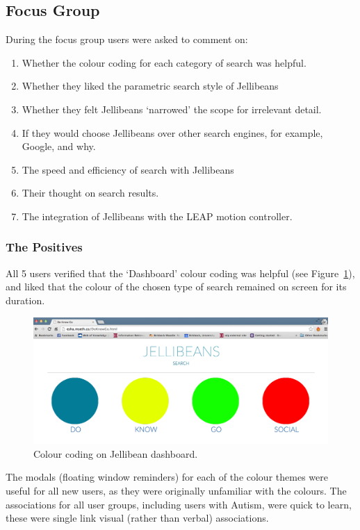 \documentclass[a4paper, 11pt]{article}
\begin{document}
\subsection{Focus Group}
During the focus group users were asked to comment on:
\begin{enumerate}
\item{Whether the colour coding for each category of search was helpful.}
\item{Whether they liked the parametric search style of Jellibeans}
\item{Whether they felt Jellibeans `narrowed' the scope for irrelevant detail.}
\item{If they would choose Jellibeans over other search engines, for example, Google, and why.}
\item{The speed and efficiency of search with Jellibeans}
\item{Their thought on search results.}
\item{The integration of Jellibeans with the LEAP motion controller.}
\end{enumerate}

\subsubsection{The Positives}
All 5 users verified that the `Dashboard' colour coding was helpful (see Figure~\ref{colourCoding}), and liked that the colour of the chosen type of search remained on screen for its duration.

\begin{figure}[H]
\begin{center}
\includegraphics[scale=0.25]{DoKnowGoSocialDashboard}
\caption{Colour coding on Jellibean dashboard.}
\label{colourCoding}
\end{center}
\end{figure}

The modals (floating window reminders) for each of the colour themes were useful for all new users, as they were originally unfamiliar with the colours. The associations for all user groups, including users with Autism, were quick to learn, these were single link visual (rather than verbal) associations.\\
\end{document}

